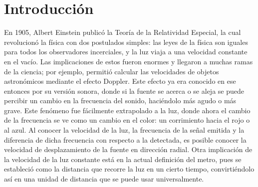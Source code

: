 \chapter*{Introducci\'on}



En 1905, Albert Einstein publicó la Teoría de la Relatividad Especial, la cual revolucionó la física con dos postulados simples: las leyes de la física son iguales para todos los observadores incerciales, y la luz viaja a una velocidad constante en el vacío. Las implicaciones de estos fueron enormes y llegaron a muchas ramas de la ciencia; por ejemplo, permitió calcular las velocidades de objetos astronómicos mediante el efecto Doppler. Este efecto ya era conocido en ese entonces por su versión sonora, donde si la fuente se acerca o se aleja se puede percibir un cambio en la frecuencia del sonido, haciéndolo más agudo o más grave. Este fenómeno fue fácilmente extrapolado a la luz, donde ahora el cambio de la frecuencia se ve como un cambio en el color: un corrimiento hacia el rojo o al azul. Al conocer la velocidad de la luz, la frecuencia de la señal emitida y la diferencia de dicha frecuencia con respecto a la detectada, es posible conocer la velocidad de desplazamiento de la fuente en dirección radial. Otra implicación de la velocidad de la luz constante está en la actual definición del metro, pues se estableció como la distancia que recorre la luz en un cierto tiempo, convirtiéndolo así en una unidad de distancia que se puede usar universalmente.


